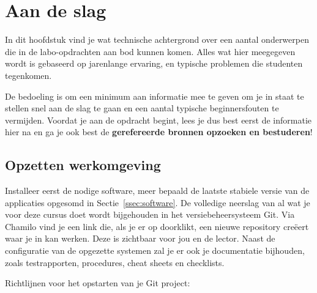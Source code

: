\chapter{Aan de slag}%
\label{ch:aan-de-slag}

In dit hoofdstuk vind je wat technische achtergrond over een aantal onderwerpen die in de labo-opdrachten aan bod kunnen komen. Alles wat hier meegegeven wordt is gebaseerd op jarenlange ervaring, en typische problemen die studenten tegenkomen.

De bedoeling is om een minimum aan informatie mee te geven om je in staat te stellen snel aan de slag te gaan en een aantal typische beginnersfouten te vermijden. Voordat je aan de opdracht begint, lees je dus best eerst de informatie hier na en ga je ook best de \textbf{gerefereerde bronnen opzoeken en bestuderen}!

\section{Opzetten werkomgeving}%
\label{sec:opzetten_werkomgeving}

Installeer eerst de nodige software, meer bepaald de laatste stabiele versie van de applicaties opgesomd in Sectie~\ref{ssec:software}. De volledige neerslag van al wat je voor deze cursus doet wordt bijgehouden in het versiebeheersysteem Git. Via Chamilo vind je een link die, als je er op doorklikt, een nieuwe repository creëert waar je in kan werken. Deze is zichtbaar voor jou en de lector. Naast de configuratie van de opgezette systemen zal je er ook je documentatie bijhouden, zoals testrapporten, procedures, cheat sheets en checklists.

Richtlijnen voor het opstarten van je Git project:

